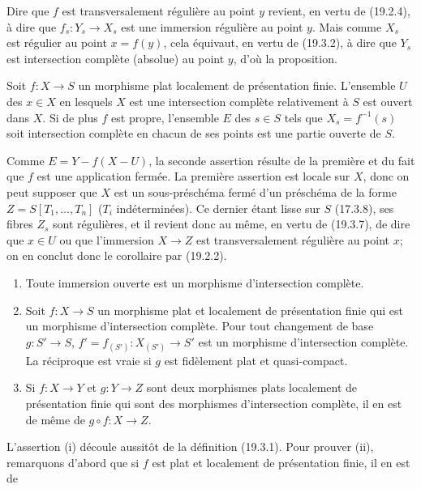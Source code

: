 Dire que $f$ est transversalement régulière au point $y$ revient, en vertu de (19.2.4), à dire que $f_s:Y_s\to X_s$ est une immersion régulière au point $y$. Mais comme $X_s$ est régulier au point $x=f(y)$, cela équivaut, en vertu de (19.3.2), à dire que $Y_s$ est intersection complète (absolue) au point $y$, d'où la proposition.

\begin{corollary}[19.3.8]
\label{IV.19.3.8}
Soit $f:X\to S$ un morphisme plat localement de présentation finie. L'ensemble $U$ des $x\in X$ en lesquels $X$ est une intersection complète relativement à $S$ est ouvert dans $X$. Si de plus $f$ est propre, l'ensemble $E$ des $s\in S$ tels que $X_s=f^{-1}(s)$ soit intersection complète en chacun de ses points est une partie ouverte de $S$.
\end{corollary}

Comme $E=Y-f(X-U)$, la seconde assertion résulte de la première et du fait que $f$ est une application fermée. La première assertion est locale sur $X$, donc on peut supposer que $X$ est un sous-préschéma fermé d'un préschéma de la forme $Z=S[T_1,\ldots,T_n]$ ($T_i$ indéterminées). Ce dernier étant lisse sur $S$ (17.3.8), ses fibres $Z_s$ sont régulières, et il revient donc au même, en vertu de (19.3.7), de dire que $x\in U$ ou que l'immersion $X\to Z$ est transversalement régulière au point $x$; on en conclut donc le corollaire par (19.2.2).

\begin{proposition}[19.3.9]
\label{IV.19.3.9}
\begin{enumerate}
  \item[(i)] Toute immersion ouverte est un morphisme d'intersection complète.
  \item[(ii)] Soit $f:X\to S$ un morphisme plat et localement de présentation finie qui est un morphisme d'intersection complète. Pour tout changement de base $g:S'\to S$, $f'=f_{(S')}:X_{(S')}\to S'$ est un morphisme d'intersection complète. La réciproque est vraie si $g$ est fidèlement plat et quasi-compact.
  \item[(iii)] Si $f:X\to Y$ et $g:Y\to Z$ sont deux morphismes plats localement de présentation finie qui sont des morphismes d'intersection complète, il en est de même de $g\circ f:X\to Z$.
\end{enumerate}
\end{proposition}

L'assertion (i) découle aussitôt de la définition (19.3.1). Pour prouver (ii), remarquons d'abord que si $f$ est plat et localement de présentation finie, il en est de

